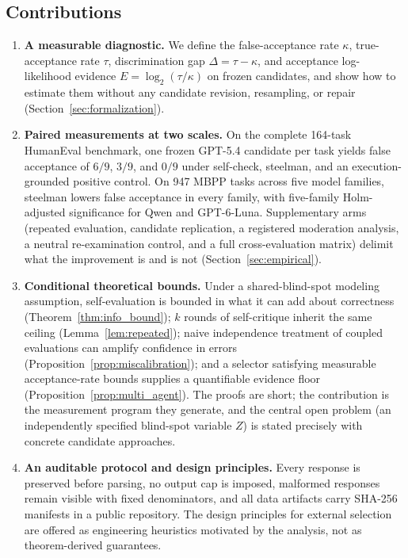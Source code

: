 \documentclass[a4paper,journal]{IAENGtran}
\begin{document}
\subsection{Contributions}

\begin{enumerate}
    \item \textbf{A measurable diagnostic.} We define the false-acceptance rate $\kappa$,
    true-acceptance rate $\tau$, discrimination gap $\Delta=\tau-\kappa$, and
    acceptance log-likelihood evidence $E=\log_2(\tau/\kappa)$ on frozen candidates, and
    show how to estimate them without any candidate revision, resampling, or repair
    (Section~\ref{sec:formalization}).
    \item \textbf{Paired measurements at two scales.} On the complete 164-task HumanEval
    benchmark, one frozen GPT-5.4 candidate per task yields false acceptance of $6/9$,
    $3/9$, and $0/9$ under self-check, steelman, and an execution-grounded positive
    control. On 947 MBPP tasks across five model families, steelman lowers false
    acceptance in every family, with five-family Holm-adjusted significance for Qwen and
    GPT-6-Luna. Supplementary arms (repeated evaluation, candidate replication, a
    registered moderation analysis, a neutral re-examination control, and a full
    cross-evaluation matrix) delimit what the improvement is and is not
    (Section~\ref{sec:empirical}).
    \item \textbf{Conditional theoretical bounds.} Under a shared-blind-spot modeling
    assumption, self-evaluation is bounded in what it can add about correctness
    (Theorem~\ref{thm:info_bound}); $k$ rounds of self-critique inherit the same ceiling
    (Lemma~\ref{lem:repeated}); naive independence treatment of coupled evaluations can
    amplify confidence in errors (Proposition~\ref{prop:miscalibration}); and a selector
    satisfying measurable acceptance-rate bounds supplies a quantifiable evidence floor
    (Proposition~\ref{prop:multi_agent}). The proofs are short; the contribution is the
    measurement program they generate, and the central open problem (an independently
    specified blind-spot variable $Z$) is stated precisely with concrete candidate
    approaches.
    \item \textbf{An auditable protocol and design principles.} Every response is
    preserved before parsing, no output cap is imposed, malformed responses remain
    visible with fixed denominators, and all data artifacts carry SHA-256 manifests in a
    public repository. The design principles for external selection are offered as
    engineering heuristics motivated by the analysis, not as theorem-derived guarantees.
\end{enumerate}
\end{document}
